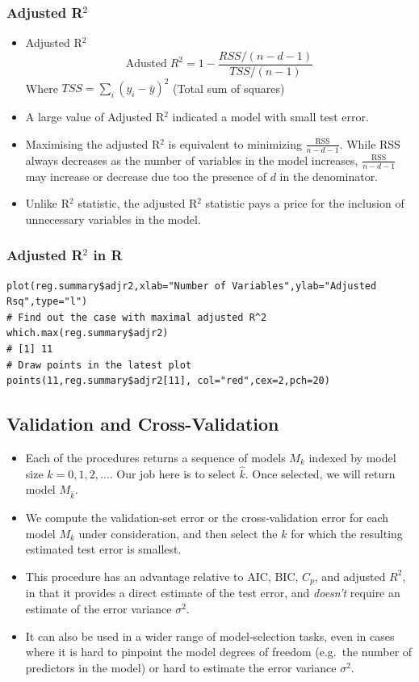 \documentclass{article}
\begin{document}
\subsubsection{Adjusted R$^2$}

\begin{itemize}
    \item Adjusted R$^2$
    \begin{equation*}
        \mathrm{Adusted } \; R^2 = 1 - \frac{RSS/(n-d-1)}{TSS/(n-1)}
    \end{equation*}
    Where $TSS = \sum_{i} (y_i - \bar{y})^2$ (Total sum of squares)
    \item A large value of Adjusted R$^2$ indicated a model with small test error.
    \item Maximising the adjusted R$^2$ is equivalent to minimizing $\frac{\mathrm{RSS}}{n-d-1}$. While RSS always decreases as the number of variables in the model increases, $\frac{\mathrm{RSS}}{n-d-1}$ may increase or decrease due too the presence of $d$ in the denominator.
    \item Unlike R$^2$ statistic, the adjusted R$^2$ statistic pays a price for the inclusion of unnecessary variables in the model.
\end{itemize}

\subsubsection{Adjusted R$^2$ in R}
\begin{lstlisting}
plot(reg.summary$adjr2,xlab="Number of Variables",ylab="Adjusted Rsq",type="l")
# Find out the case with maximal adjusted R^2
which.max(reg.summary$adjr2)
# [1] 11
# Draw points in the latest plot
points(11,reg.summary$adjr2[11], col="red",cex=2,pch=20)
\end{lstlisting}


\subsection{Validation and Cross-Validation}

\begin{itemize}
  \item Each of the procedures returns a sequence of models $M_k$ indexed by model size $k = 0, 1, 2, \dots$.  Our job here is to select $\hat{k}$.  Once selected, we will return model $M_{\hat{k}}$.
  \item We compute the validation‐set error or the cross‐validation error for each model $M_k$ under consideration, and then select the $k$ for which the resulting estimated test error is smallest.
  \item This procedure has an advantage relative to AIC, BIC, $C_p$, and adjusted $R^2$, in that it provides a direct estimate of the test error, and \emph{doesn't} require an estimate of the error variance $\sigma^2$.
  \item It can also be used in a wider range of model‐selection tasks, even in cases where it is hard to pinpoint the model degrees of freedom (e.g.\ the number of predictors in the model) or hard to estimate the error variance $\sigma^2$.
\end{itemize}
\end{document}
